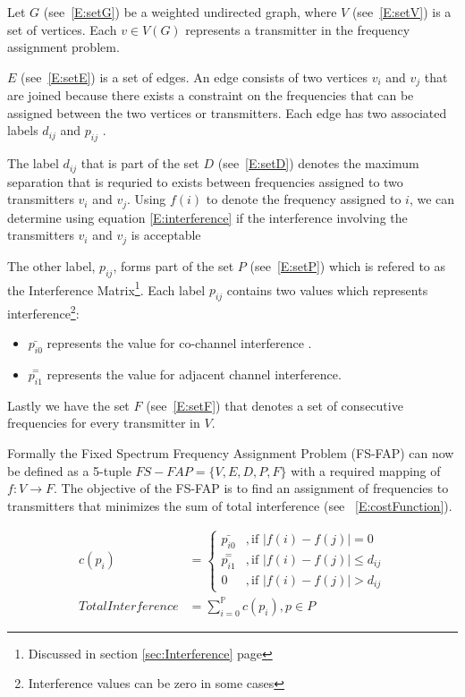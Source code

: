 Let $G$ (see~\ref{E:setG}) be a weighted undirected graph, where $V$ (see~\ref{E:setV}) is a set of vertices. Each $v \in V(G)$ represents a transmitter in the frequency assignment problem. 

$E$ (see~\ref{E:setE}) is a set of edges. An edge consists of two vertices $v_i$ and $v_j$ that are joined because there exists a constraint on the frequencies that can be assigned between the two vertices or transmitters. Each edge has two associated labels $d_{ij}$ and $p_{ij}$ \cite{FAPOrientationModel,TabuMontemanniSmith}. 

The label $d_{ij}$ that is part of the set $D$ (see~\ref{E:setD}) denotes the maximum separation that is requried to exists between frequencies assigned to two transmitters $v_i$ and $v_j$. Using $f(i)$ to denote the frequency assigned to $i$, we can determine using equation \ref{E:interference} if the interference involving the transmitters $v_i$ and $v_j$ is acceptable\cite{FAPOrientationModel,TabuMontemanniSmith}

The other label, $p_{ij}$, forms part of the set $P$ (see~\ref{E:setP}) which is refered to as the Interference Matrix\footnote{Discussed in section \ref{sec:Interference} page \pageref{sec:Interference}}. Each label $p_{ij}$ contains two values which represents interference\footnote{Interference values can be zero in some cases}:
\begin{itemize}
\item $\bar{p_{i0}}$ represents the value for co-channel interference \cite{FAPOrientationModel,TabuMontemanniSmith}. 
\item $\overset{=}{p_{i1}}$ represents the value for adjacent channel interference\cite{FAPOrientationModel,TabuMontemanniSmith}.
\end{itemize}

Lastly we have the set $F$ (see~\ref{E:setF}) that denotes a set of consecutive frequencies for every transmitter in $V$\cite{FAPOrientationModel,TabuMontemanniSmith}.

Formally the Fixed Spectrum Frequency Assignment Problem (FS-FAP) can now be defined as a 5-tuple \(FS-FAP = \{V,E,D,P,F\}\) with a required mapping of \(f: V \rightarrow F\)\cite{TabuMontemanniSmith}. The objective of the FS-FAP is to find an assignment of frequencies to transmitters that minimizes the sum of total interference (see ~\ref{E:costFunction}).

\begin{align} 
 c(p_i) &= 
 \begin{cases}
	\bar{p_{i0}} &,\text{if $|f(i) - f(j)| = 0$}\\
	\overset{=}{p_{i1}} &, \text{if $|f(i) - f(j)| \leqslant d_{ij}$}\\
	0 &,\text{if $|f(i) - f(j)| > d_{ij}$}
 \end{cases}\\
 \label{E:costFunction}
 Total Interference &= \sum^\mathbb{P}_{i = 0}c(p_i),p \in P 
\end{align}

